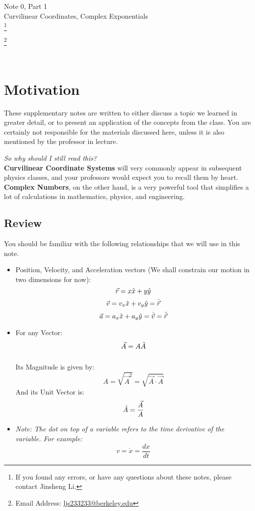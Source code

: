 \documentclass[11pt]{article}
\newcommand\blfootnote[1]{
    \begingroup
    \renewcommand\thefootnote{}\footnote{#1}
    \addtocounter{footnote}{-1}
    \endgroup
}
\theoremstyle{gangnamstyle}{\newtheorem{definition}{Definition}[]}
\theoremstyle{gangnamstyle}{\newtheorem{example}{Example}[]}
\theoremstyle{gangnamstyle}{\newtheorem{problem}{Problem}[]}
\begin{document}
\normalfont
\pagestyle{pages}


\begin{center}
\vspace{3in}
{\Large Note 0, Part 1 } \\[0.05in]
Curvilinear Coordinates, Complex Exponentials  \\ 
\blfootnote{If you found any errors, or have any questions about these notes, please contact Jinsheng Li.} \blfootnote{Email Address: \href{mailto:ljs233233@berkeley.edu}{ljs233233@berkeley.edu}} \\ [-0.5in]
\end{center}

\section*{Motivation}

These supplementary notes are written to either discuss a topic we learned in greater detail, or to present an application of the concepts from the class. You are certainly not responsible for the materials discussed here, unless it is also mentioned by the professor in lecture. 

\textit{So why should I still read this?} \\
\textbf{Curvilinear Coordinate Systems} will very commonly appear in subsequent physics classes, and your professors would expect you to recall them by heart. \textbf{Complex Numbers}, on the other hand, is a very powerful tool that simplifies a lot of calculations in mathematics, physics, and engineering. 

\subsection*{Review}

You should be familiar with the following relationships that we will use in this note. 

\begin{itemize}
\item Position, Velocity, and Acceleration vectors (We shall constrain our motion in two dimensions for now): 
\[ \Vec{r} = x\Hat{x} + y\Hat{y} \]
\[ \Vec{v} = v_x\Hat{x} + v_y\Hat{y} = \Dot{\Vec{r}} \]
\[ \Vec{a} = a_x\Hat{x} + a_y\Hat{y} = \Dot{\Vec{v}} = \Ddot{\Vec{r}} \]
\item For any Vector: 
\[ \Vec{A} = A\Hat{A} \] \\
Its Magnitude is given by: 
\[ A = \sqrt{\Vec{A}^2} = \sqrt{\Vec{A} \cdot \Vec{A}} \]
And its Unit Vector is: 
\[ \Hat{A} = \frac{\Vec{A}}{A} \]
\item \textit{Note: The dot on top of a variable refers to the time derivative of the variable. For example: }
\[ v = \Dot{x} = \frac{dx}{dt} \]
\end{itemize}
\pagebreak
\end{document}
